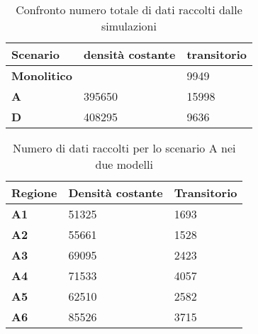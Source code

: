 \documentclass[a4paper, 12pt]{article}
\author{Aurel Pjetri}
\date{}
\begin{document}
\begin{table}[h]
  \centering
  \resizebox{0.7\textwidth}{!} {
  \begin{tabular}{ |l|l|l| }
	\hline
	\textbf{Scenario}	&		\textbf{densità costante}	&		\textbf{transitorio}	\\ \hline
	\textbf{Monolitico} &		 						&		9949		\\ \hline
	\textbf{A}			 &		395650 				&		15998		\\ \hline
	\textbf{D}			 &		408295 				&		9636		\\ \hline

  \end{tabular}
  }
  \caption{Confronto numero totale di dati raccolti dalle simulazioni}
  \label{tab:tabella-confronto}
\end{table}

\begin{table}[h]
  \centering
  \resizebox{0.7\textwidth}{!} {
  \begin{tabular}[t]{ |l|l|l| }
	\hline
	\textbf{Regione}	 &		\textbf{Densità costante}	&		\textbf{Transitorio}	\\ \hline
	\textbf{A1} 		 &		51325				&		1693		\\ \hline
	\textbf{A2}			 &		55661 				&		1528		\\ \hline
	\textbf{A3}			 &		69095 				&		2423		\\ \hline
	\textbf{A4}			 &		71533 				&		4057		\\ \hline
	\textbf{A5}			 &		62510 				&		2582		\\ \hline
	\textbf{A6}			 &		85526 				&		3715		\\ \hline

  \end{tabular}
  
  }
  \caption{Numero di dati raccolti per lo scenario A nei due modelli}
  \label{tab:tabella-dati-simulazioni-A}
\end{table}
\end{document}

